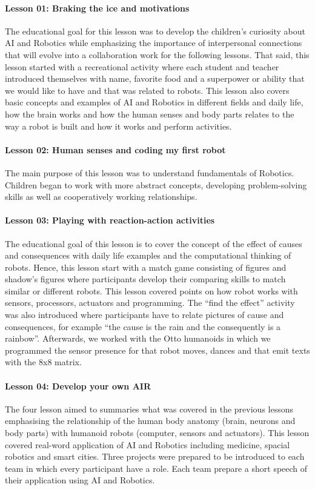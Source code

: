 \documentclass[conference]{IEEEtran}
\begin{document}
\paragraph{Lesson 01: Braking the ice and motivations} 
The educational goal for this lesson was to develop the children’s curiosity about AI and Robotics while emphasizing the importance of interpersonal connections that will evolve into a collaboration work for the following lessons.
That said, this lesson started with a recreational activity where each student and teacher introduced themselves with name, favorite food and a superpower or ability that we would like to have and that was related to robots. This lesson also covers basic concepts and examples of AI and Robotics in different fields and daily life, how the brain works and how the human senses and body parts relates to the way a robot is built and how it works and perform activities.

\paragraph{Lesson 02: Human senses and coding my first robot} 
The main purpose of this lesson was to understand fundamentals of Robotics. 
Children began to work with more abstract concepts, developing problem-solving skills as well as cooperatively working relationships. 

\paragraph{Lesson 03: Playing with reaction-action activities} 
The educational goal of this lesson is to cover the concept of the effect of causes and consequences with daily life examples and the computational thinking of robots.
Hence, this lesson start with a match game consisting of figures and shadow’s figures where participants develop their comparing skills to match similar or different robots.
This lesson covered points on how robot works with sensors, processors, actuators and programming. 
The “find the effect” activity was also introduced where participants have to relate pictures of cause and consequences, for example “the cause is the rain and the consequently is a rainbow”.
Afterwards, we worked with the Otto humanoids in which we programmed the sensor presence for that robot moves, dances and that emit texts with the 8x8 matrix.

\paragraph{Lesson 04: Develop your own AIR}
The four lesson aimed to summaries what was covered in the previous lessons emphasising the relationship of the human body anatomy (brain, neurons and body parts) with humanoid robots (computer, sensors and actuators).
This lesson covered real-word application of AI and Robotics including medicine, spacial robotics and smart cities. 
Three projects were prepared to be introduced to each team in which every participant have a role. 
Each team prepare a short speech of their application using AI and Robotics. 
\end{document}
